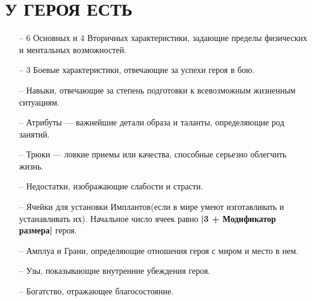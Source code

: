 \section{У ГЕРОЯ ЕСТЬ}
\begin{itemize}
\item[--] 6 Основных и 4 Вторичных характеристики, задающие пределы физических и ментальных возможностей.
\item[--] 3 Боевые характеристики, отвечающие за успехи героя в бою.
\item[--] Навыки, отвечающие за степень подготовки к всевозможным жизненным ситуациям.
\item[--] Атрибуты — важнейшие детали образа и таланты, определяющие род занятий.
\item[--] Трюки — ловкие приемы или качества, способные серьезно облегчить жизнь.
\item[--] Недостатки, изображающие слабости и страсти.
\item[--] Ячейки для установки Имплантов(если в мире умеют изготавливать и устанавливать их). Начальное число ячеек равно \textbf{|3 + Модификатор размера|} героя.
\item[--] Амплуа и Грани, определяющие отношения героя с миром и место в нем.
\item[--] Узы, показывающие внутренние убеждения героя.
\item[--] Богатство, отражающее благосостояние.
\end{itemize}

